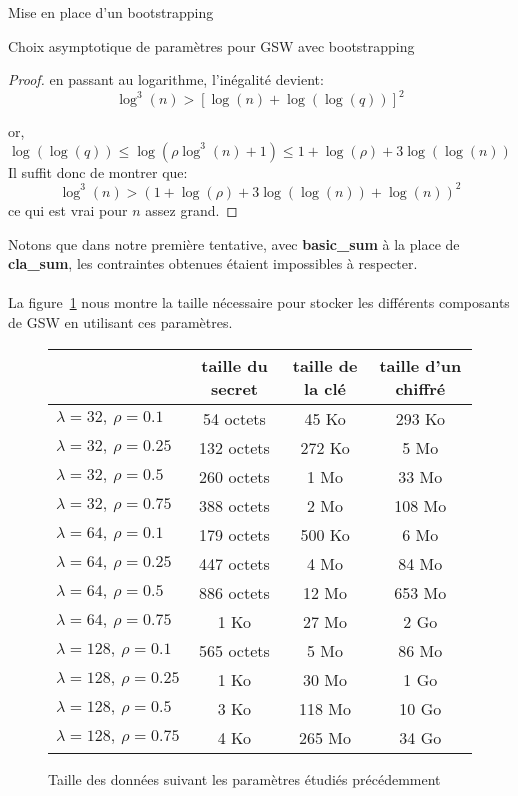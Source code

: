 \begin{section}{Mise en place d'un bootstrapping}
\begin{subsection}{Choix asymptotique de paramètres pour GSW avec bootstrapping}
\begin{proof}
en passant au logarithme, l'inégalité devient:
\[ \log^3(n) > {\left[\log(n) + \log(\log(q))\right]}^2 \]

or,
\[ \log(\log(q)) \leqslant \log(\rho \log^3(n) + 1) \leqslant 1 + \log(\rho) + 3 \log(\log(n))\]
Il suffit donc de montrer que:
\[ \log^3(n) > {(1 + \log(\rho) + 3\log(\log(n)) + \log(n))}^2 \]
ce qui est vrai pour $n$ assez grand.
\end{proof}
\begin{rmq}
Notons que dans notre première tentative, avec \textbf{basic\_sum} à la place de \textbf{cla\_sum}, 
les contraintes obtenues étaient impossibles à respecter.
\end{rmq}

\paragraph{}
La figure~\ref{size_boostrapping} nous montre la taille nécessaire
pour stocker les différents composants de GSW en utilisant ces paramètres.
\begin{figure}[!ht]
\begin{tabular}{|l|c|c|c|}
\hline
& taille du secret & taille de la clé & taille d'un chiffré \\
\hline
$\lambda = 32, \ \rho = 0.1$ & 54 octets & 45 Ko & 293 Ko \\
\hline
$\lambda = 32, \ \rho = 0.25$ & 132 octets & 272 Ko & 5 Mo \\
\hline
$\lambda = 32, \ \rho = 0.5$ & 260 octets & 1 Mo & 33 Mo \\
\hline
$\lambda = 32, \ \rho = 0.75$ & 388 octets & 2 Mo & 108 Mo \\
\hline
$\lambda = 64, \ \rho = 0.1$ & 179 octets & 500 Ko & 6 Mo \\
\hline
$\lambda = 64, \ \rho = 0.25$ & 447 octets & 4 Mo & 84 Mo \\
\hline
$\lambda = 64, \ \rho = 0.5$ & 886 octets & 12 Mo & 653 Mo \\
\hline
$\lambda = 64, \ \rho = 0.75$ & 1 Ko & 27 Mo & 2 Go \\
\hline
$\lambda = 128, \ \rho = 0.1$ & 565 octets & 5 Mo & 86 Mo \\
\hline
$\lambda = 128, \ \rho = 0.25$ & 1 Ko & 30 Mo & 1 Go \\
\hline
$\lambda = 128, \ \rho = 0.5$ & 3 Ko & 118 Mo & 10 Go \\
\hline
$\lambda = 128, \ \rho = 0.75$ & 4 Ko & 265 Mo & 34 Go \\
\hline
\end{tabular}
\caption{Taille des données suivant les paramètres étudiés précédemment}
\label{size_boostrapping}
\end{figure}

\end{subsection}
\end{section}
